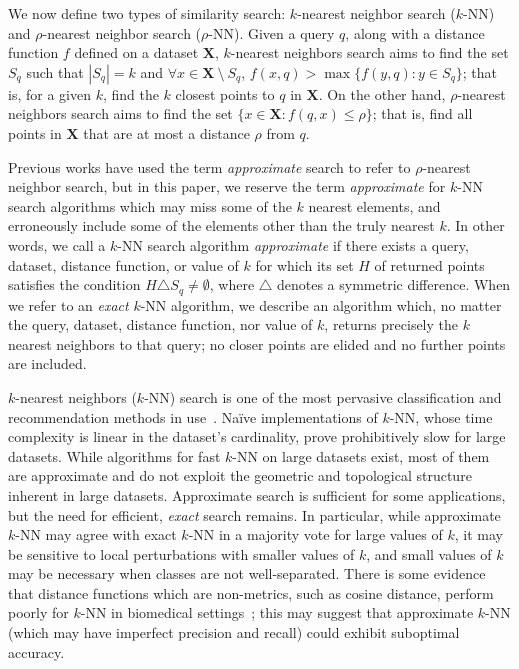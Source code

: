 We now define two types of similarity search: $k$-nearest neighbor search ($k$-NN) and $\rho$-nearest neighbor search ($\rho$-NN). 
Given a query $q$, along with a distance function $f$ defined on a dataset $\textbf{X}$, $k$-nearest neighbors search aims to find 
the set $S_q$ such that  $|S_q| = k$ and $\forall x \in \textbf{X} \ \setminus \ S_q$, $f(x, q) > \max\{f(y, q): y \in S_q \}$;
that is, for a given $k$, find the $k$ closest points to $q$ in $ \textbf{X}$.
On the other hand, $\rho$-nearest neighbors search aims to find the set $\{x \in \textbf{X}: f(q, x) \leq \rho \}$;
that is, find all points in $\textbf{X}$ that are at most a distance $\rho$ from $q$.




Previous works have used the term \emph{approximate} search to refer to $\rho$-nearest neighbor search, but in this paper, 
we reserve the term \emph{approximate} for $k$-NN search algorithms which may miss some of the $k$ nearest elements, and erroneously include some of the elements other than the truly nearest $k$.
In other words, we call a $k$-NN search algorithm \emph{approximate} if there exists a query, dataset, distance function, or value of $k$ for which its set $H$ of returned points satisfies the condition $H \triangle S_q \neq \emptyset$, where $\triangle$ denotes a symmetric difference.
When we refer to an \emph{exact} $k$-NN algorithm, we describe an algorithm which, no matter the query, dataset, distance function, nor value of $k$, returns precisely the $k$ nearest neighbors to that query;
no closer points are elided and no further points are included.


$k$-nearest neighbors ($k$-NN) search is one of the most pervasive classification and recommendation methods in use~\cite{fix1952discriminatory, cover1967nearest}. 
Na\"{i}ve implementations of $k$-NN, whose time complexity is linear in the dataset's cardinality, prove prohibitively slow for large datasets.
While algorithms for fast $k$-NN on large datasets exist, most of them are approximate and do not exploit the geometric and topological structure inherent in large datasets.
Approximate search is sufficient for some applications, but the need for efficient, \emph{exact} search remains.
In particular, while approximate $k$-NN may agree with exact $k$-NN in a majority vote for large values of $k$, it may be sensitive to local perturbations with smaller values of $k$, and small values of $k$ may be necessary when classes are not well-separated.
There is some evidence that distance functions which are non-metrics, such as cosine distance, perform poorly for $k$-NN in biomedical settings~\cite{hu2016distance};
this may suggest that approximate $k$-NN (which may have imperfect precision and recall) could exhibit suboptimal accuracy.

